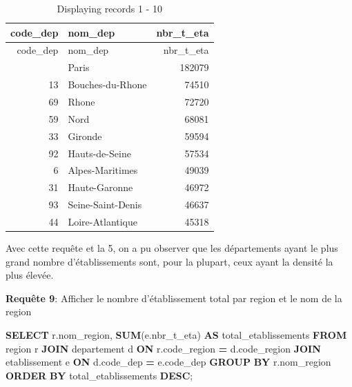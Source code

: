 \documentclass[mstat,12pt]{unswthesis}
\newenvironment{Shaded}{\begin{snugshade}}{\end{snugshade}}
\newcommand{\FunctionTok}[1]{\textcolor[rgb]{0.13,0.29,0.53}{\textbf{#1}}}
\newcommand{\KeywordTok}[1]{\textcolor[rgb]{0.13,0.29,0.53}{\textbf{#1}}}
\newcommand{\NormalTok}[1]{#1}
\newcommand{\OperatorTok}[1]{\textcolor[rgb]{0.81,0.36,0.00}{\textbf{#1}}}
\begin{document}
\begin{longtable}[]{@{}rlr@{}}
\caption{Displaying records 1 - 10}\tabularnewline
\toprule\noalign{}
code\_dep & nom\_dep & nbr\_t\_eta \\
\midrule\noalign{}
\endfirsthead
\toprule\noalign{}
code\_dep & nom\_dep & nbr\_t\_eta \\
\midrule\noalign{}
\endhead
\bottomrule\noalign{}
\endlastfoot
75 & Paris & 182079 \\
13 & Bouches-du-Rhone & 74510 \\
69 & Rhone & 72720 \\
59 & Nord & 68081 \\
33 & Gironde & 59594 \\
92 & Hauts-de-Seine & 57534 \\
6 & Alpes-Maritimes & 49039 \\
31 & Haute-Garonne & 46972 \\
93 & Seine-Saint-Denis & 46637 \\
44 & Loire-Atlantique & 45318 \\
\end{longtable}

\medskip

Avec cette requête et la 5, on a pu observer que les départements ayant
le plus grand nombre d'établissements sont, pour la plupart, ceux ayant
la densité la plus élevée.

\medskip

\textbf{Requête 9}: Afficher le nombre d'établissement total par region
et le nom de la region

\begin{Shaded}
\begin{Highlighting}[]
\KeywordTok{SELECT}\NormalTok{ r.nom\_region, }\FunctionTok{SUM}\NormalTok{(e.nbr\_t\_eta) }\KeywordTok{AS}\NormalTok{ total\_etablissements}
\KeywordTok{FROM}\NormalTok{ region r}
\KeywordTok{JOIN}\NormalTok{ departement d }\KeywordTok{ON}\NormalTok{ r.code\_region }\OperatorTok{=}\NormalTok{ d.code\_region}
\KeywordTok{JOIN}\NormalTok{ etablissement e }\KeywordTok{ON}\NormalTok{ d.code\_dep }\OperatorTok{=}\NormalTok{ e.code\_dep}
\KeywordTok{GROUP} \KeywordTok{BY}\NormalTok{ r.nom\_region}
\KeywordTok{ORDER} \KeywordTok{BY}\NormalTok{ total\_etablissements }\KeywordTok{DESC}\NormalTok{;}
\end{Highlighting}
\end{Shaded}
\end{document}
